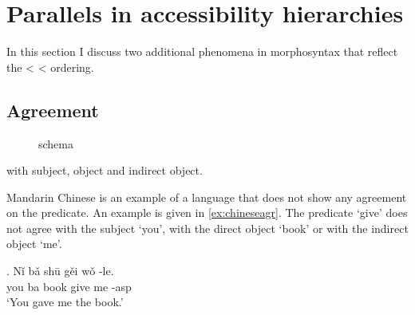 \section{Parallels in accessibility hierarchies}

In this section I discuss two additional phenomena in morphosyntax that reflect the  <  <  ordering.

\subsection{Agreement}

%

\begin{figure}[H]
  \centering
  \caption{ schema}
  \label{fig:subdoio}
\end{figure}


\citealt{moravcsik1978} with subject, object and indirect object.

Mandarin Chinese is an example of a language that does not show any agreement on the predicate. An example is given in \ref{ex:chineseagr}. The predicate  `give' does not agree with the subject  `you', with the direct object  `book' or with the indirect object  `me'.

\exg. Nǐ bǎ shū gěi wǒ -le.\\
 you ba book give me -\ac{asp}\\
 `You gave me the book.' \label{ex:chineseagr}

